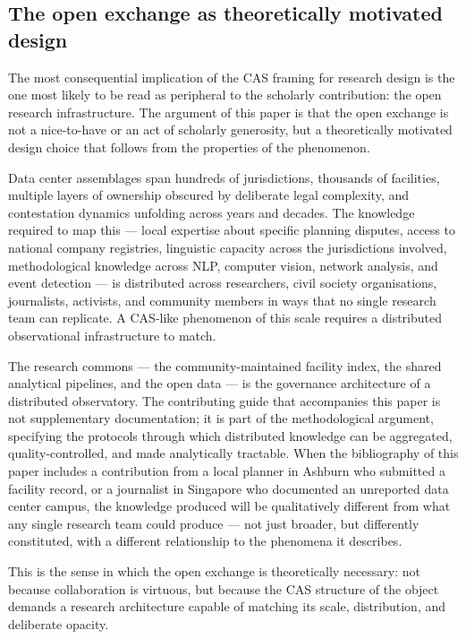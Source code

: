 \subsection{The open exchange as theoretically motivated design}

The most consequential implication of the CAS framing for research design is the one most likely to be read as peripheral to the scholarly contribution: the open research infrastructure. The argument of this paper is that the open exchange is not a nice-to-have or an act of scholarly generosity, but a theoretically motivated design choice that follows from the properties of the phenomenon.

Data center assemblages span hundreds of jurisdictions, thousands of facilities, multiple layers of ownership obscured by deliberate legal complexity, and contestation dynamics unfolding across years and decades. The knowledge required to map this — local expertise about specific planning disputes, access to national company registries, linguistic capacity across the jurisdictions involved, methodological knowledge across NLP, computer vision, network analysis, and event detection — is distributed across researchers, civil society organisations, journalists, activists, and community members in ways that no single research team can replicate. A CAS-like phenomenon of this scale requires a distributed observational infrastructure to match.

The research commons — the community-maintained facility index, the shared analytical pipelines, and the open data — is the governance architecture of a distributed observatory. The contributing guide that accompanies this paper is not supplementary documentation; it is part of the methodological argument, specifying the protocols through which distributed knowledge can be aggregated, quality-controlled, and made analytically tractable. When the bibliography of this paper includes a contribution from a local planner in Ashburn who submitted a facility record, or a journalist in Singapore who documented an unreported data center campus, the knowledge produced will be qualitatively different from what any single research team could produce — not just broader, but differently constituted, with a different relationship to the phenomena it describes.

This is the sense in which the open exchange is theoretically necessary: not because collaboration is virtuous, but because the CAS structure of the object demands a research architecture capable of matching its scale, distribution, and deliberate opacity.

